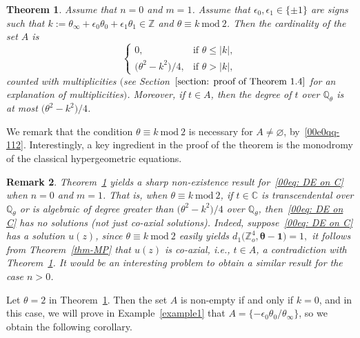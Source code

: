 \documentclass[pdftex]{sigma}
\numberwithin{equation}{section}
\newtheorem{Theorem}{Theorem}[section]
\newtheorem{Remark}[Theorem]{Remark} }
\def\C{\mathbb C}
\def\Q{\mathbb Q}
\def\Z{\mathbb Z}
\def\mod{\ \mathrm{mod}\ }
\begin{document}
\begin{Theorem} \label{theorem: sharp}
 Assume that $n=0$ and $m=1$. Assume that
 $\epsilon_0,\epsilon_1\in\{\pm1\}$ are signs such that
 $k:=\theta_\infty+\epsilon_0\theta_0+\epsilon_1\theta_1\in\Z$ and
 $\theta\equiv k\mod 2$. Then the cardinality of the set $A$ is
 \[
 \begin{cases}
 0, &\text{if }\theta\le|k|, \\
 \bigl(\theta^2-k^2\bigr)/4, &\text{if }\theta>|k|, \end{cases}
 \]
 counted with multiplicities $($see Section~$\ref{section: proof of
 Theorem 1.4}$ for an explanation of
 multiplicities$)$. Moreover, if ${t\in A}$, then the degree of $t$ over
 $\Q_\theta$ is at most $\bigl(\theta^2-k^2\bigr)/4$.
\end{Theorem}

We remark that the condition $\theta\equiv k\mod 2$ is necessary for
$A\neq\varnothing$, by~\eqref{00e0qq-112}. Interestingly, a key
ingredient in the proof of the theorem is the monodromy of the
classical hypergeometric equations.


\begin{Remark} Theorem~\ref{theorem: sharp} yields a sharp non-existence
result for~\eqref{00eq: DE on C} when $n=0$ and $m=1$. That is,
when $\theta\equiv k\mod 2$, if $t\in\C$ is transcendental over
$\Q_\theta$ or is algebraic of degree greater than $\bigl(\theta^2-k^2\bigr)/4$
over $\Q_\theta$, then~\eqref{00eq: DE on C} has no solutions (not just co-axial solutions). Indeed, suppose~\eqref{00eq: DE on C} has a solution $u(z)$, since $\theta\equiv k\mod 2$ easily yields $d_1\bigl(\Z_o^{4},{\boldsymbol\theta-\boldsymbol 1}\bigr)=1,$ it follows from Theorem~\ref{thm-MP} that $u(z)$ is co-axial, i.e., $t\in A$, a contradiction with Theorem~\ref{theorem: sharp}.
 It would be an interesting problem to obtain a similar result for the
case $n>0$.\end{Remark}

Let $\theta=2$ in Theorem~\ref{theorem: sharp}. Then the set $A$ is non-empty
 if and only if $k=0$, and in this case, we will prove in Example~\ref{example1} that $A=\{-\epsilon_0\theta_0/\theta_\infty\}$, so we obtain the following corollary.
\end{document}
